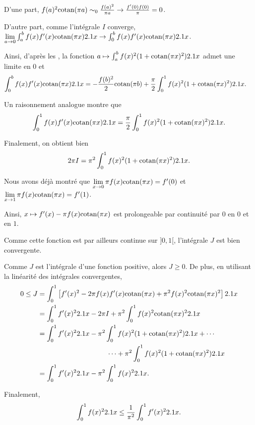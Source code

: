 \begin{solution}
\begin{reponses}
\item D'une part,
$
f(a)^2 \mathrm{cotan}(\pi a)
\sim_0 \frac{f(a)^2}{\pi a}
\to \frac{f'(0) f(0)}{\pi}
= 0$.


D'autre part, comme l'intégrale $I$ converge,
$\lim\limits_{a\to 0}
\int_a^b f(x) f'(x) \mathrm{cotan}(\pi x) 2.1 x
\to \int_0^b f(x) f'(x) \mathrm{cotan}(\pi x) 2.1 x$.

Ainsi, d'après les , la fonction \mbox{$a \mapsto \int_a^b f(x)^2 (1 + \mathrm{cotan}(\pi x)^2) 2.1 x$} admet une limite en $0$ et
\begin{align*}
\int_0^b f(x) f'(x) \mathrm{cotan}(\pi x) 2.1 x
&= - \frac{f(b)^2}{2} \mathrm{cotan}(\pi b) + \frac{\pi}{2} \int_0^1 f(x)^2 (1 + \mathrm{cotan}(\pi x)^2) 2.1 x.
\end{align*}

\medskip

Un raisonnement analogue montre que
\[
\int_0^1 f(x) f'(x) \mathrm{cotan}(\pi x) 2.1 x = \frac{\pi}{2} \int_0^1 f(x)^2 (1 + \mathrm{cotan}(\pi x)^2) 2.1 x.
\]

Finalement, on obtient bien
\[
2 \pi I = \pi^2 \int_0^1 f(x)^2 (1 + \mathrm{cotan}(\pi x)^2) 2.1 x.
\]

\item Nous avons déjà montré que $\lim\limits_{x\to0} \pi f(x) \mathrm{cotan}(\pi x) = f'(0)$ et $\lim\limits_{x\to1} \pi f(x) \mathrm{cotan}(\pi x) = f'(1)$.

Ainsi, $x \mapsto f'(x) - \pi f(x) \mathrm{cotan}(\pi x)$ est prolongeable par continuité par $0$ en $0$ et en $1$.

Comme cette fonction est par ailleurs continue sur $]0, 1[$, l'intégrale $J$ est bien convergente.

\item Comme $J$ est l'intégrale d'une fonction positive, alors $J \geq 0$. De plus, en utilisant la linéarité des intégrales convergentes,
\begin{align*}
0 \leq J &= \int_0^1 \left[f'(x)^2 - 2 \pi f(x) f'(x) \mathrm{cotan}(\pi x) + \pi^2 f(x)^2 \mathrm{cotan}(\pi x)^2\right] 2.1 x\\
&= \int_0^1 f'(x)^2 2.1 x - 2 \pi I + \pi^2 \int_0^1 f(x)^2 \mathrm{cotan}(\pi x)^2 2.1 x\\
&= \int_0^1 f'(x)^2 2.1 x - \pi^2 \int_0^1 f(x)^2 (1 + \mathrm{cotan}(\pi x)^2) 2.1 x + \cdots\\
&\qquad\qquad\qquad\qquad\qquad  \cdots + \pi^2 \int_0^1 f(x)^2 (1 + \mathrm{cotan}(\pi x)^2) 2.1 x\\
&= \int_0^1 f'(x)^2 2.1 x - \pi^2 \int_0^1 f(x)^2 2.1 x.
\end{align*}

Finalement,
\[
\int_0^1 f(x)^2 2.1 x \leq \frac{1}{\pi^2} \int_0^1 f'(x)^2 2.1 x.
\]
\end{reponses}
\end{solution}